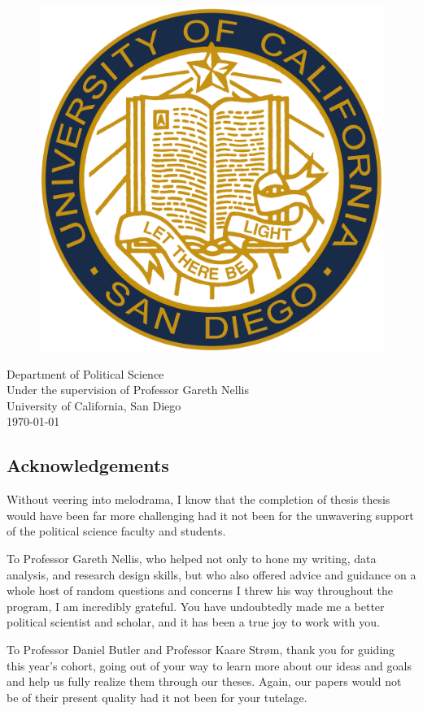 \documentclass[12pt]{article}
\begin{document}
\begin{titlepage}
\vfill
\begin{figure}[H]
\begin{center}
\includegraphics[width = .2\textwidth]{ucsd_seal.png}
\end{center}
\end{figure}

\begin{center}	
Department of Political Science\\
Under the supervision of Professor Gareth Nellis\\
University of California, San Diego\\
\today
\end{center}

\end{titlepage}


\tableofcontents

\listoffigures

\listoftables

\pagebreak


\begin{center}\section*{Acknowledgements}\end{center}
Without veering into melodrama, I know that the completion of thesis thesis would have been far more challenging had it not been for the unwavering support of the political science faculty and students.

To Professor Gareth Nellis, who helped not only to hone my writing, data analysis, and research design skills, but who also offered advice and guidance on a whole host of random questions and concerns I threw his way throughout the program, I am incredibly grateful. You have undoubtedly made me a better political scientist and scholar, and it has been a true joy to work with you.   

To Professor Daniel Butler and Professor Kaare Strøm, thank you for guiding this year's cohort, going out of your way to learn more about our ideas and goals and help us fully realize them through our theses. Again, our papers would not be of their present quality had it not been for your tutelage.
\end{document}
